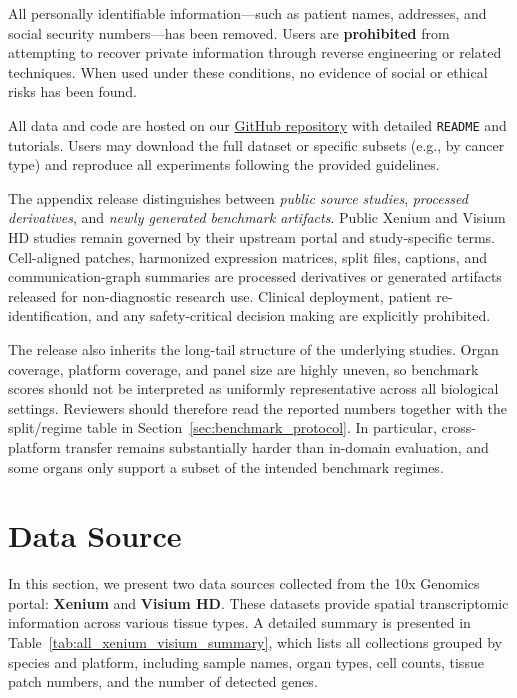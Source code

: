 \documentclass{article}
\newcommand{\dataset}{sMMC-22M\xspace}
\begin{document}
All personally identifiable information—such as patient names, addresses, and social security numbers—has been removed. Users are \textbf{prohibited} from attempting to recover private information through reverse engineering or related techniques. When used under these conditions, no evidence of social or ethical risks has been found.

All data and code are hosted on our
\href{https://anonymous.4open.science/r/\dataset-dataset-ED70}{GitHub repository} with detailed \texttt{README} and tutorials. Users may download the full dataset or specific subsets (e.g., by cancer type) and reproduce all experiments following the provided guidelines.

The appendix release distinguishes between \emph{public source studies}, \emph{processed derivatives}, and \emph{newly generated benchmark artifacts}. Public Xenium and Visium HD studies remain governed by their upstream portal and study-specific terms. Cell-aligned patches, harmonized expression matrices, split files, captions, and communication-graph summaries are processed derivatives or generated artifacts released for non-diagnostic research use. Clinical deployment, patient re-identification, and any safety-critical decision making are explicitly prohibited.

The release also inherits the long-tail structure of the underlying studies. Organ coverage, platform coverage, and panel size are highly uneven, so benchmark scores should not be interpreted as uniformly representative across all biological settings. Reviewers should therefore read the reported numbers together with the split/regime table in Section~\ref{sec:benchmark_protocol}. In particular, cross-platform transfer remains substantially harder than in-domain evaluation, and some organs only support a subset of the intended benchmark regimes.


\section{Data Source}
\label{sec:background}
\noindent
In this section, we present two data sources collected from the 10x Genomics portal: \textbf{Xenium} and \textbf{Visium HD}.
These datasets provide spatial transcriptomic information across various tissue types.
A detailed summary is presented in Table~\ref{tab:all_xenium_visium_summary}, which lists all collections grouped by species and platform, including sample names, organ types, cell counts, tissue patch numbers, and the number of detected genes.
\end{document}
